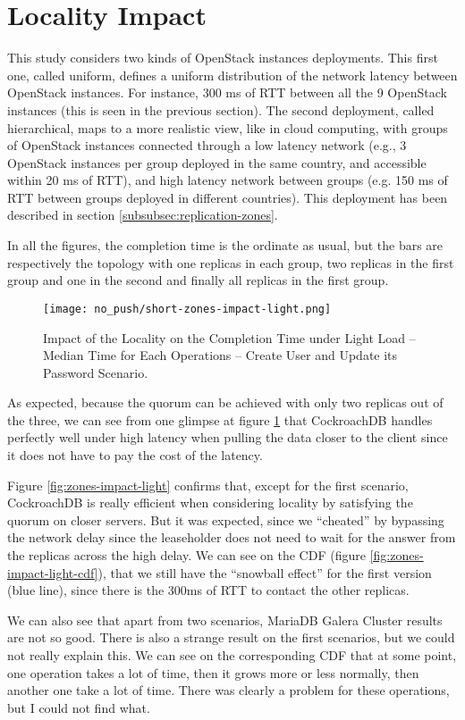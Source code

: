 \section{Locality Impact}

This study considers two kinds of OpenStack instances deployments. This first one, called uniform, defines a uniform distribution of the network latency between OpenStack instances. For instance, 300 ms of RTT between all the 9 OpenStack instances (this is seen in the previous section). The second deployment, called hierarchical, maps to a more realistic view, like in cloud computing, with groups of OpenStack instances connected through a low latency network (e.g., 3 OpenStack instances per group deployed in the same country, and accessible within 20 ms of RTT), and high latency network between groups (e.g. 150 ms of RTT between groups deployed in different countries). This deployment has been described in section \ref{subsubsec:replication-zones}.

In all the figures, the completion time is the ordinate as usual, but the bars are respectively the topology with one replicas in each group, two replicas in the first group and one in the second and finally all replicas in the first group.

\begin{figure}[H]
  \vspace{-10pt}
  \centering
  \centerline{\texttt{[image: no\_push/short-zones-impact-light.png]}}
  \vspace{-5pt}
  \caption{Impact of the Locality on the Completion Time under Light Load – Median Time for Each Operations – Create User and Update its Password Scenario.}
  \vspace{-5pt}
  \label{fig:short-zones-impact-light}
\end{figure}

As expected, because the quorum can be achieved with only two replicas out of the three, we can see from one glimpse at figure \ref{fig:short-zones-impact-light} that CockroachDB handles perfectly well under high latency when pulling the data closer to the client since it does not have to pay the cost of the latency.

Figure \ref{fig:zones-impact-light} confirms that, except for the first scenario, CockroachDB is really efficient when considering locality by satisfying the quorum on closer servers. But it was expected, since we ``cheated'' by bypassing the network delay since the leaseholder does not need to wait for the answer from the replicas across the high delay. We can see on the CDF (figure \ref{fig:zones-impact-light-cdf}), that we still have the ``snowball effect'' for the first version (blue line), since there is the 300ms of RTT to contact the other replicas.

We can also see that apart from two scenarios, MariaDB Galera Cluster results are not so good. There is also a strange result on the first scenarios, but we could not really explain this. We can see on the corresponding CDF that at some point, one operation takes a lot of time, then it grows more or less normally, then another one take a lot of time. There was clearly a problem for these operations, but I could not find what.
